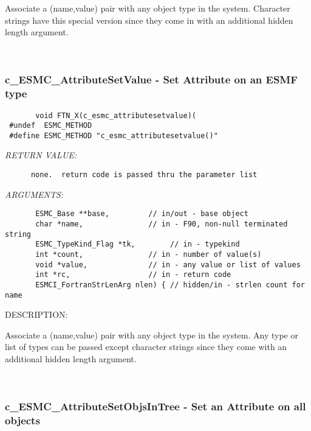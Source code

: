        Associate a (name,value) pair with any object type in the system.
       Character strings have this special version since they come in
       with an additional hidden length argument.
   
 
\mbox{}\hrulefill\ 
 
\subsubsection [c\_ESMC\_AttributeSetValue] {c\_ESMC\_AttributeSetValue - Set Attribute on an ESMF type}


  
\begin{verbatim}       void FTN_X(c_esmc_attributesetvalue)(
 #undef  ESMC_METHOD
 #define ESMC_METHOD "c_esmc_attributesetvalue()"\end{verbatim}{\em RETURN VALUE:}
\begin{verbatim}      none.  return code is passed thru the parameter list
   \end{verbatim}{\em ARGUMENTS:}
\begin{verbatim}       ESMC_Base **base,         // in/out - base object
       char *name,               // in - F90, non-null terminated string
       ESMC_TypeKind_Flag *tk,        // in - typekind
       int *count,               // in - number of value(s)
       void *value,              // in - any value or list of values
       int *rc,                  // in - return code
       ESMCI_FortranStrLenArg nlen) { // hidden/in - strlen count for name
   \end{verbatim}
{\sf DESCRIPTION:\\ }


       Associate a (name,value) pair with any object type in the system.
       Any type or list of types can be passed except character strings
       since they come with an additional hidden length argument.
   
 
\mbox{}\hrulefill\ 
 
\subsubsection [c\_ESMC\_AttributeSetObjsInTree] {c\_ESMC\_AttributeSetObjsInTree - Set an Attribute on all objects}


